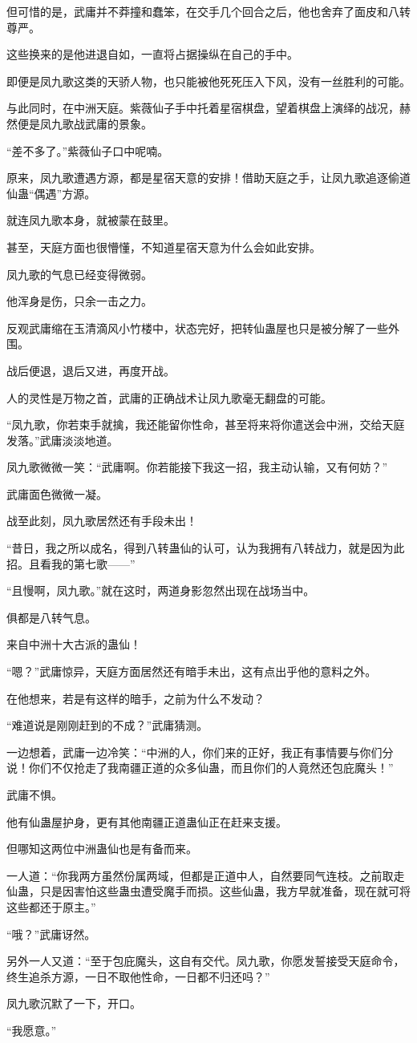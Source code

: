 \begin{this_body}
但可惜的是，武庸并不莽撞和蠢笨，在交手几个回合之后，他也舍弃了面皮和八转尊严。

这些换来的是他进退自如，一直将占据操纵在自己的手中。

即便是凤九歌这类的天骄人物，也只能被他死死压入下风，没有一丝胜利的可能。

与此同时，在中洲天庭。紫薇仙子手中托着星宿棋盘，望着棋盘上演绎的战况，赫然便是凤九歌战武庸的景象。

“差不多了。”紫薇仙子口中呢喃。

原来，凤九歌遭遇方源，都是星宿天意的安排！借助天庭之手，让凤九歌追逐偷道仙蛊“偶遇”方源。

就连凤九歌本身，就被蒙在鼓里。

甚至，天庭方面也很懵懂，不知道星宿天意为什么会如此安排。

凤九歌的气息已经变得微弱。

他浑身是伤，只余一击之力。

反观武庸缩在玉清滴风小竹楼中，状态完好，把转仙蛊屋也只是被分解了一些外围。

战后便退，退后又进，再度开战。

人的灵性是万物之首，武庸的正确战术让凤九歌毫无翻盘的可能。

“凤九歌，你若束手就擒，我还能留你性命，甚至将来将你遣送会中洲，交给天庭发落。”武庸淡淡地道。

凤九歌微微一笑：“武庸啊。你若能接下我这一招，我主动认输，又有何妨？”

武庸面色微微一凝。

战至此刻，凤九歌居然还有手段未出！

“昔日，我之所以成名，得到八转蛊仙的认可，认为我拥有八转战力，就是因为此招。且看我的第七歌——”

“且慢啊，凤九歌。”就在这时，两道身影忽然出现在战场当中。

俱都是八转气息。

来自中洲十大古派的蛊仙！

“嗯？”武庸惊异，天庭方面居然还有暗手未出，这有点出乎他的意料之外。

在他想来，若是有这样的暗手，之前为什么不发动？

“难道说是刚刚赶到的不成？”武庸猜测。

一边想着，武庸一边冷笑：“中洲的人，你们来的正好，我正有事情要与你们分说！你们不仅抢走了我南疆正道的众多仙蛊，而且你们的人竟然还包庇魔头！”

武庸不惧。

他有仙蛊屋护身，更有其他南疆正道蛊仙正在赶来支援。

但哪知这两位中洲蛊仙也是有备而来。

一人道：“你我两方虽然份属两域，但都是正道中人，自然要同气连枝。之前取走仙蛊，只是因害怕这些蛊虫遭受魔手而损。这些仙蛊，我方早就准备，现在就可将这些都还于原主。”

“哦？”武庸讶然。

另外一人又道：“至于包庇魔头，这自有交代。凤九歌，你愿发誓接受天庭命令，终生追杀方源，一日不取他性命，一日都不归还吗？”

凤九歌沉默了一下，开口。

“我愿意。”

\end{this_body}

